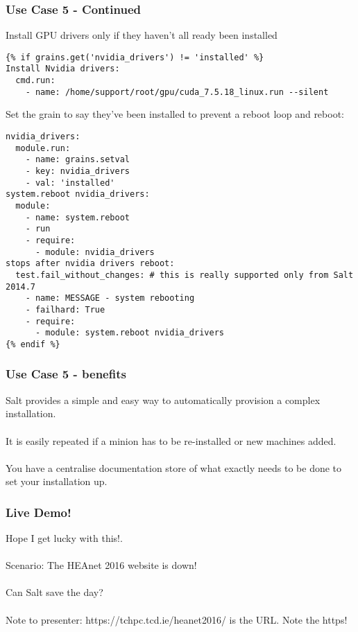 \documentclass{beamer}
\begin{document}
\begin{frame}[fragile]
\frametitle{Use Case 5 - Continued}

Install GPU drivers only if they haven't all ready been installed \\

\begin{lstlisting}[basicstyle=\tiny,]
{% if grains.get('nvidia_drivers') != 'installed' %}
Install Nvidia drivers:
  cmd.run:
    - name: /home/support/root/gpu/cuda_7.5.18_linux.run --silent
\end{lstlisting}

Set the grain to say they've been installed to prevent a reboot loop and reboot:\\

\begin{lstlisting}[basicstyle=\tiny,]
nvidia_drivers:
  module.run:
    - name: grains.setval
    - key: nvidia_drivers
    - val: 'installed'
system.reboot nvidia_drivers:
  module:
    - name: system.reboot
    - run
    - require:
      - module: nvidia_drivers
stops after nvidia drivers reboot:
  test.fail_without_changes: # this is really supported only from Salt 2014.7
    - name: MESSAGE - system rebooting
    - failhard: True
    - require:
      - module: system.reboot nvidia_drivers
{% endif %}
\end{lstlisting}
\end{frame}

\begin{frame}
\frametitle{Use Case 5 - benefits}

Salt provides a simple and easy way to automatically provision a complex installation.\\~\\

It is easily repeated if a minion has to be re-installed or new machines added.\\~\\

You have a centralise documentation store of what exactly needs to be done to set your installation up.

\end{frame}

\begin{frame}[fragile]
\frametitle{Live Demo!}

Hope I get lucky with this!.\\~\\

Scenario: The HEAnet 2016 website is down!\\~\\

Can Salt save the day?\\~\\

Note to presenter: https://tchpc.tcd.ie/heanet2016/ is the URL. Note the https!

\end{frame}
\end{document}
